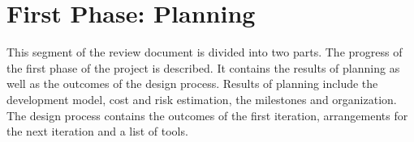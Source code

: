 \section{First Phase: Planning}
This segment of the review document is divided into two parts. 
The progress of the first phase of the project is described. 
It contains the results of planning as well as the outcomes of the design process.
Results of planning include the development model, cost and risk estimation, the milestones and organization.
The design process contains the outcomes of the first iteration, arrangements for the next iteration and a list of tools.



